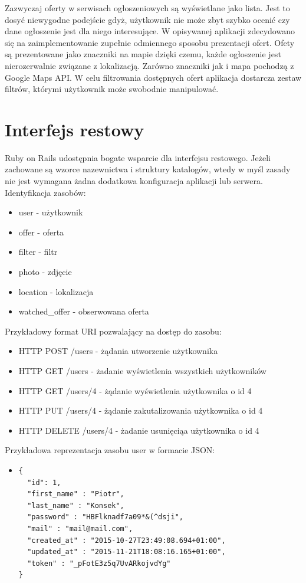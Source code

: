 Zazwyczaj oferty w serwisach ogłoszeniowych są wyświetlane jako lista. Jest to dosyć niewygodne podejście gdyż, użytkownik nie może zbyt szybko ocenić czy dane ogłoszenie jest dla niego interesujące. W opisywanej aplikacji zdecydowano się na zaimplementowanie zupełnie odmiennego sposobu prezentacji ofert. Ofety są prezentowane jako znaczniki na mapie dzięki czemu, każde ogłoszenie jest nierozerwalnie związane z lokalizacją. Zarówno znaczniki jak i mapa pochodzą z Google Maps API. W celu filtrowania dostępnych ofert aplikacja dostarcza zestaw filtrów, którymi użytkownik może swobodnie manipulować. 

\section{Interfejs restowy}
\label{sec:interfejsRestowy}
Ruby on Rails udostępnia bogate wsparcie dla interfejsu restowego. Jeżeli zachowane są wzorce nazewnictwa i struktury katalogów, wtedy w myśl zasady  nie jest wymagana żadna dodatkowa konfiguracja aplikacji lub serwera.\cite{rails}\\
Identyfikacja zasobów:
\begin{itemize}
\item user - użytkownik
\item offer - oferta
\item filter - filtr
\item photo - zdjęcie
\item location - lokalizacja
\item watched\_offer - obserwowana oferta
\end{itemize}
Przykładowy format URI pozwalający na dostęp do zasobu:
\begin{itemize}
\item HTTP POST /users - żądania utworzenie użytkownika
\item HTTP GET /users - żadanie wyświetlenia wszystkich użytkowników
\item HTTP GET /users/4 - żądanie wyświetlenia użytkownika o id 4
\item HTTP PUT /users/4 - żądanie zakutalizowania użytkownika o id 4
\item HTTP DELETE /users/4 - żadanie usunięciąa użytkownika o id 4
\end{itemize}
Przykładowa reprezentacja zasobu user w formacie JSON:
\begin{itemize}
\item \begin{lstlisting}
{
  "id": 1,
  "first_name" : "Piotr",
  "last_name" : "Konsek",
  "password" : "HBFlknadf7a09*&(^dsji",
  "mail" : "mail@mail.com",
  "created_at" : "2015-10-27T23:49:08.694+01:00",
  "updated_at" : "2015-11-21T18:08:16.165+01:00",
  "token" : "_pFotE3z5q7UvARkojvdYg"
}
\end{lstlisting}
\end{itemize}

